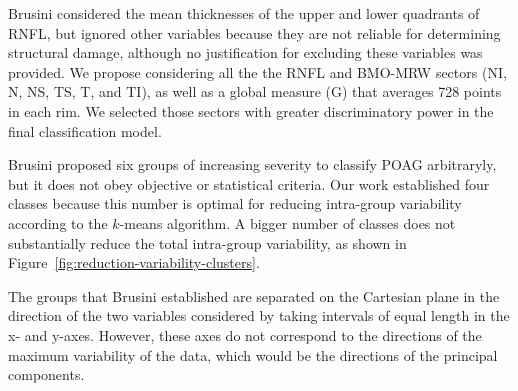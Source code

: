 \documentclass[jcm,article,submit,moreauthors,pdftex]{Definitions/mdpi}
\begin{document}
Brusini considered the mean thicknesses of the upper and lower quadrants of RNFL, but ignored other variables because they are not reliable for determining structural damage, although no justification for excluding these variables was provided. We propose considering all the the RNFL and BMO-MRW  sectors (NI, N, NS, TS, T, and TI), as well as a global measure (G) that averages 728 points in each rim. We selected those sectors with greater discriminatory power in the final classification model. 

Brusini proposed six groups of increasing severity to classify POAG arbitraryly, but it does not obey objective or statistical criteria. Our work established four classes because this number is optimal for reducing intra-group variability according to the $k$-means algorithm. A bigger number of classes does not substantially reduce the total intra-group variability, as shown in Figure~\ref{fig:reduction-variability-clusters}.

The groups that Brusini established are separated on the Cartesian plane in the direction of the two variables considered by taking intervals of equal length in the x- and y-axes. However, these axes do not correspond to the directions of the maximum variability of the data, which would be the directions of the principal components.  
\end{document}
